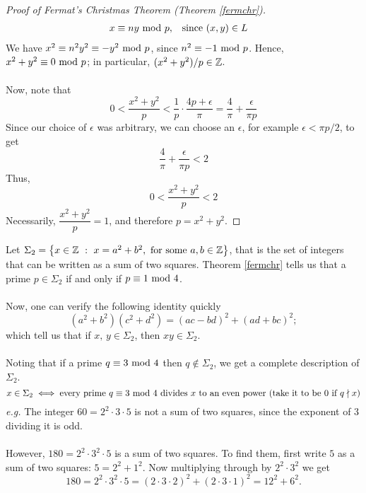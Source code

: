 \begin{proof}[Proof of Fermat's Christmas Theorem (Theorem \ref{fermchr})]
\begin{align*}
x \equiv ny \text{ mod }{p}, &\quad \text{since }(x,y) \in L
\end{align*}
We have $x^2 \equiv n^2y^2 \equiv - y^2 \text{ mod }{p}$, since $n^2 \equiv -1\text{ mod }{p}$. Hence, $x^2 + y^2 \equiv 0 \text{ mod }{p}$; in particular, $(x^2 + y^2)/p \in \mathbb Z$.\\
\\
Now, note that
\[0 < \frac{x^2 + y^2}{p} < \frac{1}{p}\cdot \frac{4p + \epsilon}{\pi} = \frac{4}{\pi} + \frac{\epsilon}{\pi p}\]
Since our choice of $\epsilon$ was arbitrary, we can choose an $\epsilon$, for example $\epsilon < \pi p/2$, to get
\[\frac{4}{\pi} + \frac{\epsilon}{\pi p}< 2\]
Thus, 
\[0 < \frac{x^2 + y^2}{p} < 2\]
Necessarily, $\dfrac{x^2 + y^2}{p} = 1$, and therefore $p = x^2 + y^2$.
\end{proof}

\vspace*{1.5em}

\begin{remark}
Let $\Sigma_2 = \left\{x \in \mathbb Z\ :\ x = a^2 + b^2,\ \text{for some $a,b \in \mathbb Z$}\right\}$, that is the set of integers that can be written as a sum of two squares. Theorem \ref{fermchr} tells us that a prime $p \in \Sigma_2$ if and only if $p\equiv 1 \text{ mod }{4}$.\\
\\
Now, one can verify the following identity quickly
\[(a^2 + b^2)(c^2 + d^2) = (ac-bd)^2 + (ad + bc)^2;\]
which tell us that if $x,\,y \in \Sigma_2$, then $xy \in \Sigma_2$.\\
\\
Noting that if a prime $q \equiv 3\text{ mod }{4}$ then $q \notin \Sigma_2$, we get a complete description of $\Sigma_2$. 
\[x \in \Sigma_2 \iff \text{every prime $q \equiv 3 \text{ mod }{4}$ divides $x$ to an even power (take it to be $0$ if $q\nmid x$)}\]
\emph{e.g.} The integer $60 = 2^2\cdot 3\cdot 5$ is not a sum of two squares, since the exponent of $3$ dividing it is odd.\\
\\
However, $180 = 2^2\cdot 3^2\cdot 5$ is a sum of two squares. To find them, first write $5$ as a sum of two squares: $5 = 2^2 + 1^2$. Now multiplying through by $2^2\cdot 3^2$ we get \[180 = 2^2\cdot 3^2\cdot 5 = (2\cdot 3\cdot 2)^2 + (2\cdot 3\cdot 1)^2 = 12^2 + 6^2.\]
\end{remark}

\vspace*{1.5em}

